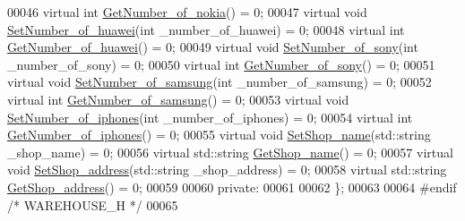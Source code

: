 \begin{DoxyCode}
00046     \textcolor{keyword}{virtual} \textcolor{keywordtype}{int} \hyperlink{class_w_a_r_e_h_o_u_s_e_a27681648a8edcaee6c968b7ffe97ef40}{GetNumber\_of\_nokia}() = 0;
00047     \textcolor{keyword}{virtual} \textcolor{keywordtype}{void} \hyperlink{class_w_a_r_e_h_o_u_s_e_ac0bd1c55f03bd8685163c0413be30ed1}{SetNumber\_of\_huawei}(\textcolor{keywordtype}{int} \_number\_of\_huawei) = 0;
00048     \textcolor{keyword}{virtual} \textcolor{keywordtype}{int} \hyperlink{class_w_a_r_e_h_o_u_s_e_adc96b7eec7ce949b02d5413fa3815991}{GetNumber\_of\_huawei}() = 0;
00049     \textcolor{keyword}{virtual} \textcolor{keywordtype}{void} \hyperlink{class_w_a_r_e_h_o_u_s_e_aaa0244f513caf1c886a4bd24af72d8aa}{SetNumber\_of\_sony}(\textcolor{keywordtype}{int} \_number\_of\_sony) = 0;
00050     \textcolor{keyword}{virtual} \textcolor{keywordtype}{int} \hyperlink{class_w_a_r_e_h_o_u_s_e_a7bac68719dc829c5002dfe4333300b76}{GetNumber\_of\_sony}() = 0;
00051     \textcolor{keyword}{virtual} \textcolor{keywordtype}{void} \hyperlink{class_w_a_r_e_h_o_u_s_e_a251878c76f2143c0db5863548118555c}{SetNumber\_of\_samsung}(\textcolor{keywordtype}{int} \_number\_of\_samsung) = 0;
00052     \textcolor{keyword}{virtual} \textcolor{keywordtype}{int} \hyperlink{class_w_a_r_e_h_o_u_s_e_ace5070fb2546482d39effdad0c5c8013}{GetNumber\_of\_samsung}() = 0;
00053     \textcolor{keyword}{virtual} \textcolor{keywordtype}{void} \hyperlink{class_w_a_r_e_h_o_u_s_e_ac522b8812b1554d8f18f967c0b64ad98}{SetNumber\_of\_iphones}(\textcolor{keywordtype}{int} \_number\_of\_iphones) = 0;
00054     \textcolor{keyword}{virtual} \textcolor{keywordtype}{int} \hyperlink{class_w_a_r_e_h_o_u_s_e_a296a84da4d198c798a6686dbe94d5d69}{GetNumber\_of\_iphones}() = 0;
00055     \textcolor{keyword}{virtual} \textcolor{keywordtype}{void} \hyperlink{class_w_a_r_e_h_o_u_s_e_a2703b514a6c2a403f392a61dbb066b46}{SetShop\_name}(std::string \_shop\_name) = 0;
00056     \textcolor{keyword}{virtual} std::string \hyperlink{class_w_a_r_e_h_o_u_s_e_aef518a1984623c261351a3429d133222}{GetShop\_name}() = 0;
00057     \textcolor{keyword}{virtual} \textcolor{keywordtype}{void} \hyperlink{class_w_a_r_e_h_o_u_s_e_abb864be9031bba0bcd96ca16edc15476}{SetShop\_address}(std::string \_shop\_address) = 0;
00058     \textcolor{keyword}{virtual} std::string \hyperlink{class_w_a_r_e_h_o_u_s_e_a3525cf304b157992335584c8de81e8e5}{GetShop\_address}() = 0;
00059     
00060 \textcolor{keyword}{private}:
00061 
00062 \};
00063 
00064 \textcolor{preprocessor}{#endif }\textcolor{comment}{/* WAREHOUSE\_H */}\textcolor{preprocessor}{}
00065 
\end{DoxyCode}
